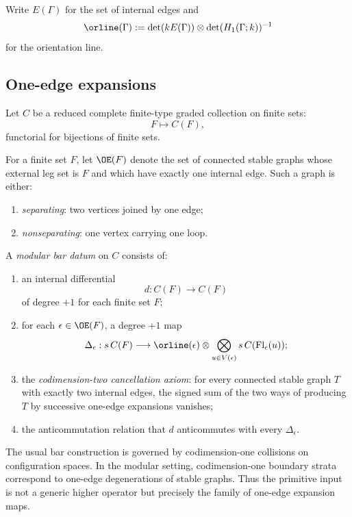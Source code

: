 Write $E(\Gamma)$ for the set of internal edges and
\[
\orline(\Gamma):=\det(kE(\Gamma))\otimes \det(H_1(\Gamma;k))^{-1}
\]
for the orientation line.

\subsection{One-edge expansions}

Let $C$ be a reduced complete finite-type graded collection on finite sets:
\[
F\longmapsto C(F),
\]
functorial for bijections of finite sets.

\begin{definition}
For a finite set $F$, let $\OE(F)$ denote the set of connected stable graphs whose
external leg set is $F$ and which have exactly one internal edge. Such a graph is either:
\begin{enumerate}[leftmargin=2.4em]
\item \emph{separating}: two vertices joined by one edge;
\item \emph{nonseparating}: one vertex carrying one loop.
\end{enumerate}
\end{definition}

\begin{definition}
A \emph{modular bar datum} on $C$ consists of:
\begin{enumerate}[leftmargin=2.4em]
\item an internal differential
\[
d:C(F)\to C(F)
\]
of degree $+1$ for each finite set $F$;
\item for each $\epsilon\in \OE(F)$, a degree $+1$ map
\[
\Delta_\epsilon:
s\,C(F)\longrightarrow
\orline(\epsilon)\otimes \bigotimes_{u\in V(\epsilon)} s\,C(\mathrm{Fl}_\epsilon(u));
\]
\item the \emph{codimension-two cancellation axiom}: for every connected stable graph
$T$ with exactly two internal edges, the signed sum of the two ways of producing $T$
by successive one-edge expansions vanishes;
\item the anticommutation relation that $d$ anticommutes with every $\Delta_\epsilon$.
\end{enumerate}
\end{definition}

\begin{remark}
The usual bar construction is governed by codimension-one collisions on configuration
spaces. In the modular setting, codimension-one boundary strata correspond to one-edge
degenerations of stable graphs. Thus the primitive input is not a generic higher operator
but precisely the family of one-edge expansion maps.
\end{remark}

